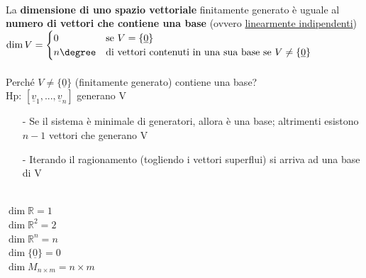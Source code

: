 \begin{proposizione}
	\phantom{}\\
	La \textbf{dimensione di uno spazio vettoriale} finitamente generato è uguale al \textbf{numero di vettori che contiene una base} (ovvero \underline{linearmente indipendenti})\\
	$
		\dim V= 
		\begin{cases}
		  0 & \text{se } V=\{\underline{0}\}\\
		  n\degree & \text{di vettori contenuti in una sua base se } V\neq \{\underline{0}\}
		\end{cases}
	$\\\\
	Perché $V\neq\{\underline{0}\}$ (finitamente generato) contiene una base?\\
	Hp: $[\underline{v}_1,...,\underline{v}_n]$ generano V
	\begin{itemize}
		\item[-] Se il sistema è minimale di generatori, allora è una base; altrimenti esistono $n-1$ vettori che generano V
		\item[-] Iterando il ragionamento (togliendo i vettori superflui) si arriva ad una base di V
	\end{itemize}
	\begin{es}
		\phantom{}\\
		$\dim\mathbb{R}=1$\\
		$\dim\mathbb{R}^2=2$\\
		$\dim\mathbb{R}^n=n$\\
		$\dim\{\underline{0}\}=0$\\
		$\dim M_{n\times m}=n\times m$
	\end{es}
\end{proposizione}

